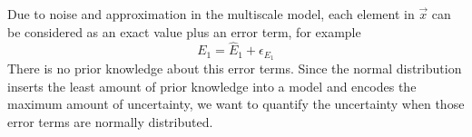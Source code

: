 \documentclass[letterpaper,12pt]{article}
\begin{document}
Due to noise and approximation in the multiscale model, each element in $\vec{x}$ can be considered as an exact value plus an error term, for example $$E_1 = \hat{E}_1 + \epsilon_{E_1} $$
There is no prior knowledge about this error terms. 
Since the normal distribution inserts the least amount of prior knowledge into a model and encodes the maximum amount of uncertainty, we want to quantify the uncertainty when those error terms are normally distributed. 
%
%
\end{document}
